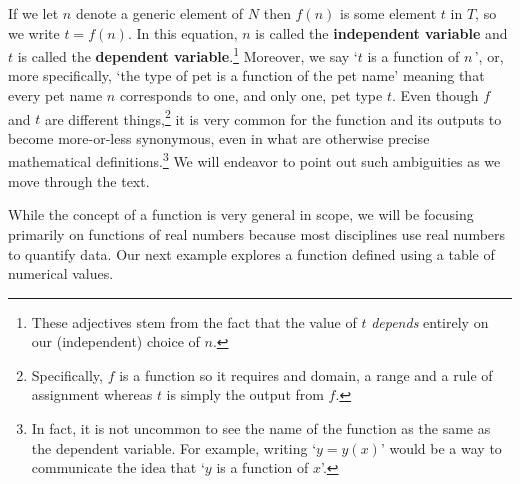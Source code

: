 If we let $n$ denote a generic element of $N$ then $f(n)$ is some element $t$ in $T$, so we write $t = f(n)$.  In this equation, $n$ is called the \textbf{independent variable} and $t$ is called the  \textbf{dependent variable}.\footnote{These adjectives stem from the fact that the value of $t$ \textit{depends} entirely on our (independent) choice of $n$.}    Moreover, we say `$t$ is a function of $n\,$',  or, more specifically, `the type of pet is a function of the pet name'  meaning that every pet name $n$ corresponds to one, and only one, pet type $t$.   Even though $f$ and $t$ are different things,\footnote{Specifically, $f$ is a function so it requires and domain, a range and a rule of assignment whereas $t$ is simply the output from $f$.} it is very common for the  function and its outputs to become more-or-less synonymous, even in what are otherwise precise mathematical definitions.\footnote{In fact, it is not uncommon to see the name of the function as the same as the dependent variable. For example, writing `$y = y(x)$'  would be a way to communicate the idea that `$y$ is a function of $x$'.}  We will endeavor to point out such ambiguities as we move through the text.

\medskip

While the concept of a function is very general in scope, we will be focusing primarily on functions of real numbers because most disciplines use real numbers to quantify data.  Our next example explores a function defined using a table of numerical values.

